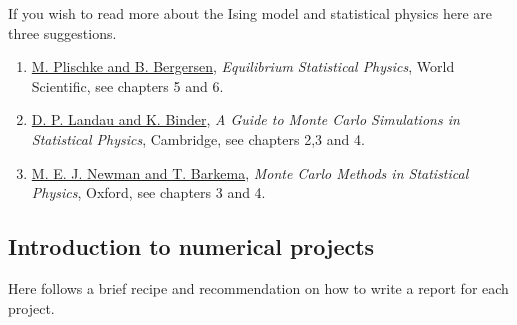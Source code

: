 \documentclass[%
oneside,                 %
final,                   %
10pt]{article}
\begin{document}
\noindent
If you wish to read more about the Ising model and statistical physics here are three suggestions.

\begin{enumerate}
\item \href{{http://www.worldscientific.com/worldscibooks/10.1142/5660}}{M. Plischke and B. Bergersen}, \emph{Equilibrium Statistical Physics}, World Scientific, see chapters 5 and 6.

\item \href{{http://www.cambridge.org/no/academic/subjects/physics/computational-science-and-modelling/guide-monte-carlo-simulations-statistical-physics-4th-edition?format=HB}}{D. P. Landau and K. Binder}, \emph{A Guide to Monte Carlo Simulations in Statistical Physics}, Cambridge, see chapters 2,3 and 4.

\item \href{{https://global.oup.com/academic/product/monte-carlo-methods-in-statistical-physics-9780198517979?cc=no&lang=en&}}{M. E. J. Newman and T. Barkema}, \emph{Monte Carlo Methods in Statistical Physics}, Oxford, see chapters 3 and 4.
\end{enumerate}

\noindent
\subsection*{Introduction to numerical projects}

Here follows a brief recipe and recommendation on how to write a report for each
project.
\end{document}
